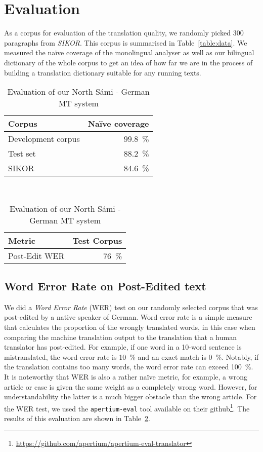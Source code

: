 \documentclass{flammie}
\begin{document}
\section{Evaluation}

As a corpus for evaluation of the translation quality, we randomly picked 300
paragraphs from \textit{SIKOR}. This corpus is summarised in
Table~\ref{table:data}.  We measured the naïve coverage of the monolingual
analyser as well as our bilingual dictionary of the whole corpus to get an idea
of how far we are in the process of building a translation dictionary suitable
for any running texts.

\begin{table}[htb]
    \centering
    \begin{tabular}{l|r}
        \bf Corpus & \bf Naïve coverage \\
        \hline
        Development corpus & 99.8~\% \\
        Test set & 88.2~\% \\
        SIKOR & 84.6~\% \\
    \end{tabular}
    \vspace{1em} \\
    \begin{tabular}{l|r}
        \bf Metric & \bf Test Corpus \\
        \hline
        Post-Edit WER & 76~\% \\
    \end{tabular}
    \caption{Evaluation of our North Sámi - German MT system}
    \label{tab:my_label}
\end{table}

\subsection{Word Error Rate on Post-Edited text}

We did a \textit{Word Error Rate} (WER) test on our randomly selected corpus
that was post-edited by a native speaker of German.  Word error rate is a simple
measure that calculates the proportion of the wrongly translated words, in this
case when comparing the machine translation output to the translation that a
human translator has post-edited.  For example, if one word in a 10-word
sentence is mistranslated, the word-error rate is 10~\% and an exact match is
0~\%. Notably, if the translation contains too many words, the word error rate
can exceed 100~\%.  It is noteworthy that WER is also a rather naïve metric, for
example, a wrong article or case is given the same weight as a completely wrong
word. However, for understandability the latter is a much bigger obstacle than
the wrong article.  For the WER test, we used the \texttt{apertium-eval} tool
available on their
github\footnote{\url{https://github.com/apertium/apertium-eval-translator}}.
The results of this evaluation are shown in Table~\ref{tab:my_label}.
\end{document}
